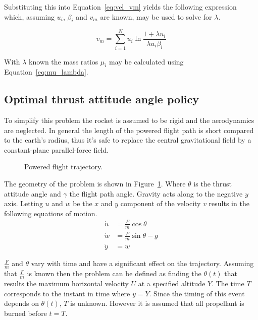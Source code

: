 Substituting this into Equation~\eqref{eq:vel_vm} yields the following expression which, assuming $u_i$, $\beta_i$ and $v_m$ are known, may be used to solve for $\lambda$.

\begin{equation}
    v_m = \sum_{i=1}^N u_i \ln{\frac{1+\lambda u_i}{\lambda u_i \beta_i}}
\end{equation}

With $\lambda$ known the mass ratios $\mu_i$ may be calculated using Equation~\eqref{eq:mu_lambda}.


\subsection{Optimal thrust attitude angle policy}
To simplify this problem the rocket is assumed to be rigid and the aerodynamics are neglected. In general the length of the powered flight path is short compared to the earth's radius, thus it's safe to replace the central gravitational field by a constant-plane parallel-force field.

\begin{figure}[ht]			
	\centering
				
	\caption{Powered flight trajectory\cite{thomson2012introduction}.}
	\label{fig:pow_fly_trj_an}
\end{figure}
The geometry of the problem is shown in Figure~\ref{fig:pow_fly_trj_an}. Where $\theta$ is the thrust attitude angle and $\gamma$ the flight path angle. Gravity acts along to the negative $y$ axis. Letting $u$ and $w$ be the $x$ and $y$ component of the velocity $v$ results in the following equations of motion.
\begin{align}
    \dot{u} &= \frac{F}{m}\cos{\theta} \label{eq:eom_udot} \\
    \dot{w} &= \frac{F}{m}\sin{\theta} - g \label{eq:eom_wdot}\\
    \dot{y} &= w \label{eq:eom_ydot}
\end{align}

$\frac{F}{m}$ and $\theta$ vary with time and have a significant effect on the trajectory. Assuming that $\frac{F}{m}$ is known then the problem can be defined as finding the $\theta\left(t\right)$ that results the maximum horizontal velocity $U$ at a specified altitude $Y$. The time $T$ corresponds to the instant in time where $y=Y$. Since the timing of this event depends on $\theta\left(t\right)$, $T$ is unknown. However it is assumed that all propellant is burned before $t=T$.


